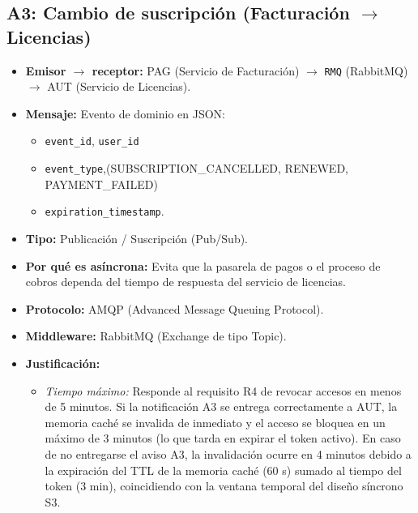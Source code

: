 \subsection{A3: Cambio de suscripción (Facturación $\rightarrow$ Licencias)}
\label{sub:a3}

\begin{itemize}
    \item \textbf{Emisor $\rightarrow$ receptor:}
    PAG (Servicio de Facturación) $\rightarrow$ \texttt{RMQ} (RabbitMQ) $\rightarrow$ AUT (Servicio de Licencias).

    \item \textbf{Mensaje:}
    Evento de dominio en JSON: 
    \begin{itemize}
       \item \texttt{event\_id}, \texttt{user\_id}
       \item \texttt{event\_type},(SUBSCRIPTION\_CANCELLED, RENEWED, PAYMENT\_FAILED)
       \item \texttt{expiration\_timestamp}.
    \end{itemize}
    
    
    \item \textbf{Tipo:}
    Publicación / Suscripción (Pub/Sub).

    \item \textbf{Por qué es asíncrona:}
    Evita que la pasarela de pagos o el proceso de cobros dependa del tiempo de respuesta del servicio de licencias.

    \item \textbf{Protocolo:}
    AMQP (Advanced Message Queuing Protocol).

    \item \textbf{Middleware:}
    RabbitMQ (Exchange de tipo Topic).

    \item \textbf{Justificación:}
    \begin{itemize}
        \item \textit{Tiempo máximo:}
        Responde al requisito R4 de revocar accesos en menos de 5 minutos. Si la notificación A3 se entrega correctamente a AUT, la memoria caché se invalida de inmediato y el acceso se bloquea en un máximo de 3 minutos
        (lo que tarda en expirar el token activo). En caso de no entregarse el aviso A3, la invalidación ocurre en 4 minutos debido a la expiración del TTL de la memoria caché (60 s) sumado al tiempo del token (3 min),
        coincidiendo con la ventana temporal del diseño síncrono S3.



\end{itemize}
\end{itemize}
